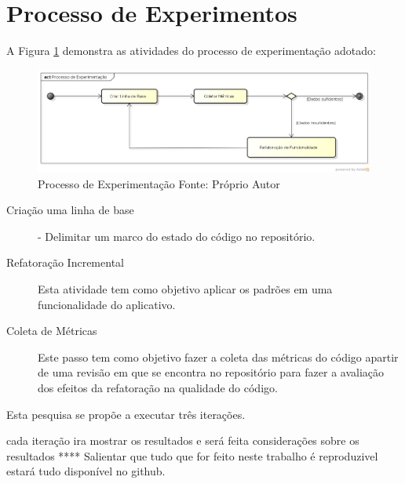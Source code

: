 \section{Processo de Experimentos}


A Figura \ref{processo_experimentacao} demonstra as atividades do processo de
experimentação adotado:
\begin{figure}[!h]
	\centering
	\includegraphics[scale=0.5]{img/processo_experimentacao.png}
	\caption{Processo de Experimentação Fonte: Próprio Autor}
	\label{processo_experimentacao}
\end{figure}

\begin{description}
\item[Criação uma linha de base] - Delimitar um marco do estado do código no
repositório.
\item[Refatoração Incremental] Esta atividade tem como objetivo aplicar os
padrões em uma funcionalidade do aplicativo.
\item[Coleta de Métricas] Este passo tem como objetivo fazer a coleta
das métricas do código apartir de uma revisão em que se encontra no repositório
para fazer a avaliação dos efeitos da refatoração na qualidade do código.
\end{description}

Esta pesquisa se propõe a executar três iterações.

cada iteração ira mostrar os resultados e será feita considerações sobre os
resultados **** Salientar que tudo que for feito neste trabalho é reproduzivel estará tudo
disponível no github.

